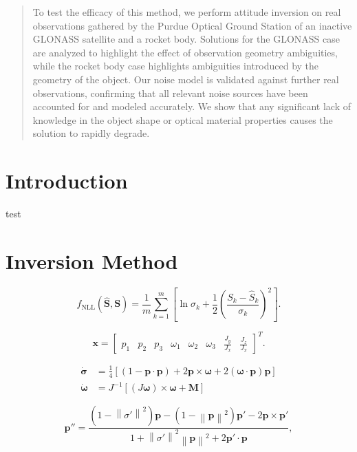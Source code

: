 \documentclass[a4paper,twocolumn]{spaceDebrisC} %
\newcommand{\vctr}[1]{\bm{#1}}
\newcommand{\norm}[1]{\left\lVert#1\right\rVert}
\begin{document}
\begin{abstract}
To test the efficacy of this method, we perform attitude inversion on real observations gathered by the Purdue Optical Ground Station of an inactive GLONASS satellite and a rocket body. Solutions for the GLONASS case are analyzed to highlight the effect of observation geometry ambiguities, while the rocket body case highlights ambiguities introduced by the geometry of the object. Our noise model is validated against further real observations, confirming that all relevant noise sources have been accounted for and modeled accurately. We show that any significant lack of knowledge in the object shape or optical material properties causes the solution to rapidly degrade.

\end{abstract}

\section{Introduction}

test

\section{Inversion Method}

\begin{equation} \label{eq:nll_loss}
  f_\text{NLL}(\hat{\vctr{S}}, \vctr{S}) = \frac{1}{m}\sum_{k=1}^{m}\left[\ln\sigma_k + \frac{1}{2}\left(\frac{S_k - \hat{S}_k}{\sigma_k}\right)^2 \right].
 \end{equation}

\begin{equation}
  \vctr{x} = \begin{bmatrix} 
  p_1 & p_2 & p_3 & \omega_1 & \omega_2 & \omega_3 & \frac{J_y}{J_x} & \frac{J_z}{J_x}
  \end{bmatrix}^T.
 \end{equation}

\begin{align}
  \vctr{\dot{\sigma}} &= \frac{1}{4} \left[ \left(1 - \vctr{p} \cdot \vctr{p}\right) + 2\vctr{p} \times \vctr{\omega} + 2 \left(\vctr{\omega} \cdot \vctr{p} \right)\vctr{p} \right] \label{eq:mrp_kde} \\
  \vctr{\dot{\omega}} &= J^{-1} \left[ \left(J \vctr{\omega}\right) \times \vctr{\omega} + \vctr{M}\right] \label{eq:rbtf_dynamics}
\end{align}

\begin{equation}
  \vctr{p}'' = \frac{\left(1-\norm{\sigma'}^2\right)\vctr{p} - \left(1-\norm{\vctr{p}}^2\right)\vctr{p}' - 2\vctr{p} \times \vctr{p}'}{1 + \norm{\sigma'}^2 \norm{\vctr{p}}^2 + 2\vctr{p}' \cdot \vctr{p}},
\end{equation}
\end{document}
